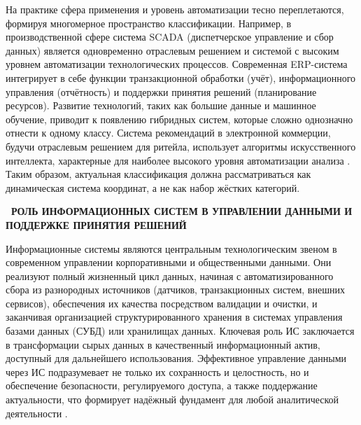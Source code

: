 \documentclass{SibFU-docs}
\begin{document}
На практике сфера применения и уровень автоматизации тесно переплетаются, формируя многомерное пространство классификации. Например, в производственной сфере система SCADA (диспетчерское управление и сбор данных) является одновременно отраслевым решением и системой с высоким уровнем автоматизации технологических процессов. Современная ERP-система интегрирует в себе функции транзакционной обработки (учёт), информационного управления (отчётность) и поддержки принятия решений (планирование ресурсов). Развитие технологий, таких как большие данные и машинное обучение, приводит к появлению гибридных систем, которые сложно однозначно отнести к одному классу. Система рекомендаций в электронной коммерции, будучи отраслевым решением для ритейла, использует алгоритмы искусственного интеллекта, характерные для наиболее высокого уровня автоматизации анализа \cite{gartner-it-glossary}. Таким образом, актуальная классификация должна рассматриваться как динамическая система координат, а не как набор жёстких категорий.

\newpage
{}
\begin{center}\textbf{\thesection\ РОЛЬ ИНФОРМАЦИОННЫХ СИСТЕМ В УПРАВЛЕНИИ ДАННЫМИ И ПОДДЕРЖКЕ ПРИНЯТИЯ РЕШЕНИЙ}\end{center}
\vspace*{-1.5em}

Информационные системы являются центральным технологическим звеном в современном управлении корпоративными и общественными данными. Они реализуют полный жизненный цикл данных, начиная с автоматизированного сбора из разнородных источников (датчиков, транзакционных систем, внешних сервисов), обеспечения их качества посредством валидации и очистки, и заканчивая организацией структурированного хранения в системах управления базами данных (СУБД) или хранилищах данных. Ключевая роль ИС заключается в трансформации сырых данных в качественный информационный актив, доступный для дальнейшего использования. Эффективное управление данными через ИС подразумевает не только их сохранность и целостность, но и обеспечение безопасности, регулируемого доступа, а также поддержание актуальности, что формирует надёжный фундамент для любой аналитической деятельности \cite{is_management}.

\end{document}
